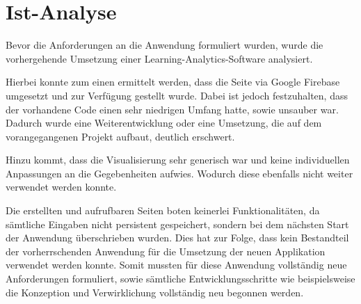 \section{Ist-Analyse}

Bevor die Anforderungen an die Anwendung formuliert wurden, wurde die vorhergehende Umsetzung einer Learning-Analytics-Software analysiert.

Hierbei konnte zum einen ermittelt werden, dass die Seite via Google Firebase umgesetzt und zur Verfügung gestellt wurde.
Dabei ist jedoch festzuhalten, dass der vorhandene Code einen sehr niedrigen Umfang hatte, sowie unsauber war.
Dadurch wurde eine Weiterentwicklung oder eine Umsetzung, die auf dem vorangegangenen Projekt aufbaut, deutlich erschwert.

Hinzu kommt, dass die Visualisierung sehr generisch war und keine individuellen Anpassungen an die Gegebenheiten aufwies. Wodurch diese ebenfalls nicht weiter verwendet werden konnte.

Die erstellten und aufrufbaren Seiten boten keinerlei Funktionalitäten, da sämtliche Eingaben nicht persistent gespeichert, sondern bei dem nächsten Start der Anwendung überschrieben wurden.
Dies hat zur Folge, dass kein Bestandteil der vorherrschenden Anwendung für die Umsetzung der neuen Applikation verwendet werden konnte.
Somit mussten für diese Anwendung vollständig neue Anforderungen formuliert, sowie sämtliche Entwicklungsschritte wie beispielsweise die Konzeption und Verwirklichung vollständig neu begonnen werden.
